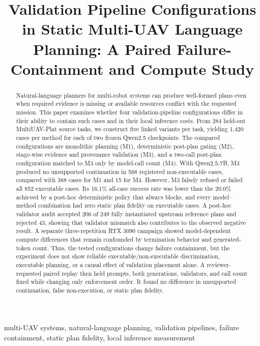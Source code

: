 \documentclass[conference]{IEEEtran}
\title{Validation Pipeline Configurations in Static Multi-UAV Language Planning: A Paired
Failure-Containment and Compute Study}
\author{
\IEEEauthorblockN{Mohammed Alnuwaiser\IEEEauthorrefmark{1} and
Dr.~Aishwarya Tomar\IEEEauthorrefmark{2}}
\IEEEauthorblockA{\IEEEauthorrefmark{1}~ALBA7OOTH Research Lab}
\IEEEauthorblockA{\IEEEauthorrefmark{2}~Assistant Professor, Department of Electronics Engineering,\\
Harcourt Butler Technical University (HBTU), Kanpur, India}
}
\newcommand{\Mone}{\textsc{M1}\xspace}
\newcommand{\Mtwo}{\textsc{M2}\xspace}
\newcommand{\Mthree}{\textsc{M3}\xspace}
\newcommand{\Mfour}{\textsc{M4}\xspace}
\begin{document}
\maketitle

\begin{abstract}
Natural-language planners for multi-robot systems can produce well-formed plans
even when required evidence is missing or available resources conflict with the
requested mission. This paper examines whether four validation-pipeline
configurations differ in their ability to contain such cases and in their local
inference costs. From 284 held-out MultiUAV-Plat source tasks, we construct five
linked variants per task, yielding 1,420 cases per method for each of two frozen
Qwen2.5 checkpoints. The compared configurations are monolithic planning
(\Mone), deterministic post-plan gating (\Mtwo), stage-wise evidence and
provenance validation (\Mthree), and a two-call post-plan configuration matched
to \Mthree only by model-call count (\Mfour). With Qwen2.5-7B, \Mthree produced
no unsupported continuation in 568 registered non-executable cases, compared
with 388 cases for \Mone and 15 for \Mfour. However, \Mthree falsely refused or
failed all 852 executable cases. Its 16.1\% all-case success rate was lower than
the 20.0\% achieved by a post-hoc deterministic policy that always blocks, and
every model--method combination had zero static plan fidelity on executable
cases. A post-hoc validator audit accepted 206 of 249 fully instantiated
upstream reference plans and rejected 43, showing that validator mismatch also
contributes to the observed negative result. A separate three-repetition RTX
3090 campaign showed model-dependent compute differences that remain
confounded by termination behavior and generated-token count. Thus, the tested
configurations change failure containment, but the experiment does not show
reliable executable/non-executable discrimination, executable planning, or a
 causal effect of validation placement alone. A reviewer-requested paired replay
 then held prompts, both generations, validators, and call count fixed while
 changing only enforcement order. It found no difference in unsupported
 continuation, false non-execution, or static plan fidelity.
\end{abstract}

\begin{IEEEkeywords}
multi-UAV systems, natural-language planning, validation pipelines, failure
containment, static plan fidelity, local inference measurement
\end{IEEEkeywords}
\end{document}
